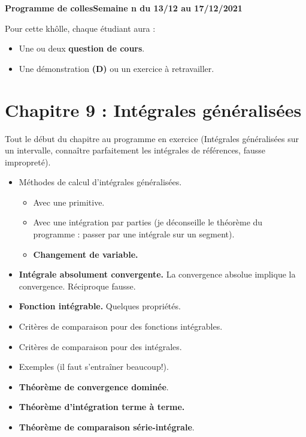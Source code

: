 \documentclass[twoside,a4paper,french,10pt]{VcCours}
\begin{document}

\begin{center}
\large\bf
Programme de collesSemaine n du 13/12 au 17/12/2021
\end{center}
\separationTitre


Pour cette khôlle, chaque étudiant aura :
\begin{itemize}
\item Une ou deux \textbf{question de cours}.
\item Une démonstration \textbf{(D)} ou un exercice à retravailler.
\end{itemize}


  \section*{Chapitre 9 : Intégrales généralisées}
  Tout le début du chapitre au programme en exercice (Intégrales généralisées sur un intervalle, connaître parfaitement les intégrales de références, fausse impropreté).
  \begin{itemize}
    \item Méthodes de calcul d'intégrales généralisées.
    \begin{itemize}
    \item Avec une primitive.
    \item Avec une intégration par parties (je déconseille le théorème du programme : passer par une intégrale sur un segment).
    \item \textbf{Changement de variable.}
    \end{itemize}
    \item \textbf{Intégrale absolument convergente.} La convergence absolue implique la convergence. Réciproque fausse.
    \item \textbf{Fonction intégrable.} Quelques propriétés.
    \item Critères de comparaison pour des fonctions intégrables.
    \item Critères de comparaison pour des intégrales.
    \item Exemples (il faut s'entraîner beaucoup!).
    \item \textbf{Théorème de convergence dominée}. 
    \item \textbf{Théorème d'intégration terme à terme.}
    \item \textbf{Théorème de comparaison série-intégrale}.
  \end{itemize}  
\end{document}
